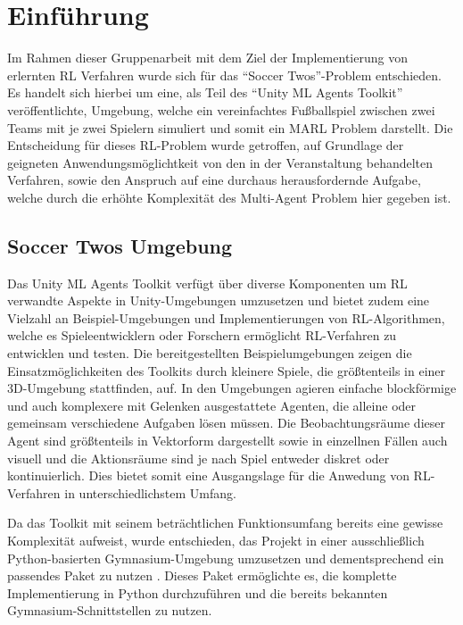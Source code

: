 \chapter{Einführung} \label{chapter:1}

Im Rahmen dieser Gruppenarbeit mit dem Ziel der Implementierung von erlernten \acf{RL} Verfahren wurde sich für das ``Soccer Twos''-Problem \cite[p. 15]{juliani2020} entschieden. Es handelt sich hierbei um eine, als Teil des ``Unity \ac{ML} Agents Toolkit'' \cite{juliani2020} veröffentlichte, Umgebung, welche ein vereinfachtes Fußballspiel zwischen zwei Teams mit je zwei Spielern simuliert und somit ein \acf{MARL} Problem darstellt.
Die Entscheidung für dieses \ac{RL}-Problem wurde getroffen, auf Grundlage der geigneten Anwendungsmöglichtkeit von den in der Veranstaltung behandelten Verfahren, sowie den Anspruch auf eine durchaus herausfordernde Aufgabe, welche durch die erhöhte Komplexität des Multi-Agent Problem hier gegeben ist. 

\section{Soccer Twos Umgebung}

Das Unity \ac{ML} Agents Toolkit verfügt über diverse Komponenten um \ac{RL} verwandte Aspekte in Unity-Umgebungen umzusetzen und bietet zudem eine Vielzahl an Beispiel-Umgebungen und Implementierungen von \ac{RL}-Algorithmen, welche es Spieleentwicklern oder Forschern ermöglicht \ac{RL}-Verfahren zu entwicklen und testen. 
Die bereitgestellten Beispielumgebungen zeigen die Einsatzmöglichkeiten des Toolkits durch kleinere Spiele, die größtenteils in einer 3D-Umgebung stattfinden, auf. In den Umgebungen agieren einfache blockförmige und auch komplexere mit Gelenken ausgestattete Agenten, die alleine oder gemeinsam verschiedene Aufgaben lösen müssen. Die Beobachtungsräume dieser Agent sind größtenteils in Vektorform dargestellt sowie in einzellnen Fällen auch visuell und die Aktionsräume sind je nach Spiel entweder diskret oder kontinuierlich. Dies bietet somit eine Ausgangslage für die Anwedung von \ac{RL}-Verfahren in unterschiedlichstem Umfang.

Da das Toolkit mit seinem beträchtlichen Funktionsumfang bereits eine gewisse Komplexität aufweist, wurde entschieden, das Projekt in einer ausschließlich Python-basierten Gymnasium-Umgebung umzusetzen und dementsprechend ein passendes Paket zu nutzen \cite{soccertwos}. Dieses Paket ermöglichte es, die komplette Implementierung in Python durchzuführen und die bereits bekannten Gymnasium-Schnittstellen zu nutzen.

